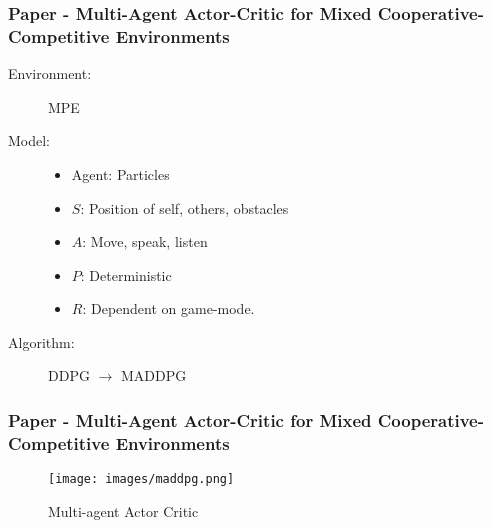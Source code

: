 \documentclass{beamer}
\begin{document}
\begin{frame} %
    \frametitle{Paper \thepapercounter - Multi-Agent Actor-Critic for Mixed 
    Cooperative-Competitive Environments}
    \begin{description}
        \item[Environment:] MPE
        \item[Model:]
        \begin{itemize} \small
            \item Agent: Particles
            \item $S$: Position of self, others, obstacles
            \item $A$: Move, speak, listen
            \item $P$: Deterministic
            \item $R$: Dependent on game-mode. 
        \end{itemize}
        \item[Algorithm:] DDPG $\rightarrow$ MADDPG
    \end{description}
\end{frame}

\begin{frame}
    \frametitle{Paper \thepapercounter - Multi-Agent Actor-Critic for Mixed 
    Cooperative-Competitive Environments\cite{lowe2020}}
    \begin{figure}\small
        \texttt{[image: images/maddpg.png]}
        \caption{Multi-agent Actor Critic\cite{lowe2020}}
    \end{figure}
\end{frame}
\end{document}
